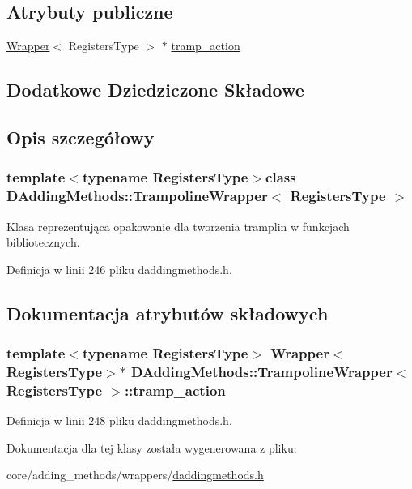 \subsection*{Atrybuty publiczne}
\begin{DoxyCompactItemize}
\item 
\hyperlink{class_d_adding_methods_1_1_wrapper}{Wrapper}$<$ Registers\-Type $>$ $\ast$ \hyperlink{class_d_adding_methods_1_1_trampoline_wrapper_ad8edbc5d2b33a52be1bcaf5a4437339c}{tramp\-\_\-action}
\end{DoxyCompactItemize}
\subsection*{Dodatkowe Dziedziczone Składowe}


\subsection{Opis szczegółowy}
\subsubsection*{template$<$typename Registers\-Type$>$class D\-Adding\-Methods\-::\-Trampoline\-Wrapper$<$ Registers\-Type $>$}

Klasa reprezentująca opakowanie dla tworzenia tramplin w funkcjach bibliotecznych. 

Definicja w linii 246 pliku daddingmethods.\-h.



\subsection{Dokumentacja atrybutów składowych}
\hypertarget{class_d_adding_methods_1_1_trampoline_wrapper_ad8edbc5d2b33a52be1bcaf5a4437339c}{
\subsubsection[{tramp\-\_\-action}]{\setlength{\rightskip}{0pt plus 5cm}template$<$typename Registers\-Type$>$ {\bf Wrapper}$<$Registers\-Type$>$$\ast$ {\bf D\-Adding\-Methods\-::\-Trampoline\-Wrapper}$<$ Registers\-Type $>$\-::tramp\-\_\-action}}\label{class_d_adding_methods_1_1_trampoline_wrapper_ad8edbc5d2b33a52be1bcaf5a4437339c}


Definicja w linii 248 pliku daddingmethods.\-h.



Dokumentacja dla tej klasy została wygenerowana z pliku\-:\begin{DoxyCompactItemize}
\item 
core/adding\-\_\-methods/wrappers/\hyperlink{daddingmethods_8h}{daddingmethods.\-h}\end{DoxyCompactItemize}
